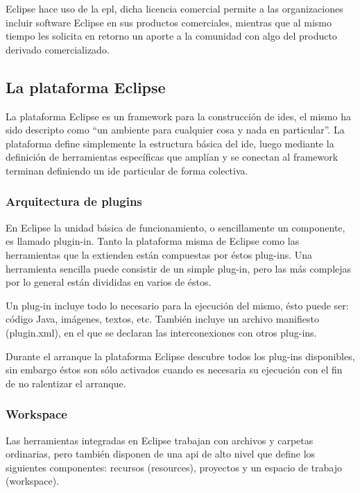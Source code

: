 \documentclass[a4paper,12pt,oneside,spanish]{book}
\begin{document}
Eclipse hace uso de la \gls{epl}, dicha licencia comercial permite a las organizaciones incluir software Eclipse en sus productos comerciales, mientras que al mismo tiempo les solicita en retorno un aporte a la comunidad con algo del producto derivado comercializado.


\subsection{La plataforma Eclipse}

La plataforma Eclipse es un framework para la construcción de \glspl{ide}, el mismo ha sido descripto como ``un ambiente para cualquier cosa y nada en particular''. La plataforma define simplemente la estructura básica del \gls{ide}, luego mediante la definición de herramientas específicas que amplían y se conectan al framework terminan definiendo un \gls{ide} particular de forma colectiva.


\subsubsection{Arquitectura de plugins}

En Eclipse la unidad básica de funcionamiento, o sencillamente un componente, es llamado plugin-in. Tanto la plataforma misma de Eclipse como las herramientas que la extienden están compuestas por éstos plug-ins. Una herramienta sencilla puede consistir de un simple plug-in, pero las más complejas por lo general están divididas en varios de éstos.

Un plug-in incluye todo lo necesario para la ejecución del mismo, ésto puede ser: código Java, imágenes, textos, etc. También incluye un archivo manifiesto (plugin.xml), en el que se declaran las interconexiones con otros plug-ins.

Durante el arranque la plataforma Eclipse descubre todos los plug-ins disponibles, sin embargo éstos son sólo activados cuando es necesaria su ejecución con el fin de no ralentizar el arranque.


\subsubsection{Workspace}

Las herramientas integradas en Eclipse trabajan con archivos y carpetas ordinarias, pero también disponen de una \gls{api} de alto nivel que define los siguientes componentes: recursos (resources), proyectos y un espacio de trabajo (workspace).
\end{document}
